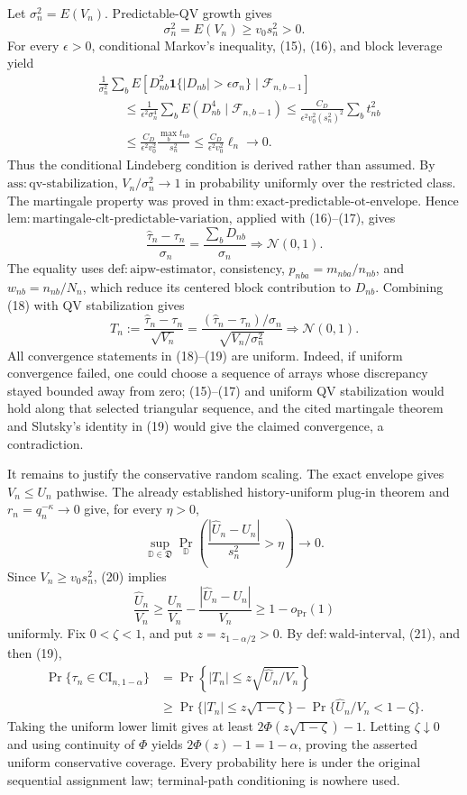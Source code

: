 Let \(\sigma_n^2=E(V_n)\). Predictable-QV growth gives
\[
\sigma_n^2=E(V_n)\ge v_0s_n^2>0.
\tag{16}
\]
For every \(\epsilon>0\), conditional Markov's inequality, (15), (16), and block leverage yield
\[
\begin{aligned}
&\frac1{\sigma_n^2}\sum_b
E\left[D_{nb}^2\mathbf1\{|D_{nb}|>\epsilon\sigma_n\}
\mid\mathcal F_{n,b-1}\right]\\
&\qquad\le\frac1{\epsilon^2\sigma_n^4}\sum_bE(D_{nb}^4\mid\mathcal F_{n,b-1})
\le\frac{C_D}{\epsilon^2v_0^2(s_n^2)^2}\sum_bt_{nb}^2\\
&\qquad\le\frac{C_D}{\epsilon^2v_0^2}
\frac{\max_bt_{nb}}{s_n^2}
\le\frac{C_D}{\epsilon^2v_0^2}\ell_n\longrightarrow0.
\end{aligned}
\tag{17}
\]
Thus the conditional Lindeberg condition is derived rather than assumed. By \(\mathrm{ass:qv\text{-}stabilization}\), \(V_n/\sigma_n^2\to1\) in probability uniformly over the restricted class. The martingale property was proved in \(\mathrm{thm:exact\text{-}predictable\text{-}ot\text{-}envelope}\). Hence \(\mathrm{lem:martingale\text{-}clt\text{-}predictable\text{-}variation}\), applied with (16)--(17), gives
\[
\frac{\widehat\tau_n-\tau_n}{\sigma_n}
=\frac{\sum_bD_{nb}}{\sigma_n}\Rightarrow\mathcal N(0,1).
\tag{18}
\]
The equality uses \(\mathrm{def:aipw\text{-}estimator}\), consistency, \(p_{nba}=m_{nba}/n_{nb}\), and \(w_{nb}=n_{nb}/N_n\), which reduce its centered block contribution to \(D_{nb}\). Combining (18) with QV stabilization gives
\[
T_n:=\frac{\widehat\tau_n-\tau_n}{\sqrt{V_n}}
=\frac{(\widehat\tau_n-\tau_n)/\sigma_n}{\sqrt{V_n/\sigma_n^2}}
\Rightarrow\mathcal N(0,1).
\tag{19}
\]
All convergence statements in (18)--(19) are uniform. Indeed, if uniform convergence failed, one could choose a sequence of arrays whose discrepancy stayed bounded away from zero; (15)--(17) and uniform QV stabilization would hold along that selected triangular sequence, and the cited martingale theorem and Slutsky's identity in (19) would give the claimed convergence, a contradiction.

It remains to justify the conservative random scaling. The exact envelope gives \(V_n\le U_n\) pathwise. The already established history-uniform plug-in theorem and \(r_n=q_n^{-\kappa}\to0\) give, for every \(\eta>0\),
\[
\sup_{\mathbb D\in\mathfrak D}
\Pr_{\mathbb D}\left(\frac{|\widehat U_n-U_n|}{s_n^2}>\eta\right)\longrightarrow0.
\tag{20}
\]
Since \(V_n\ge v_0s_n^2\), (20) implies
\[
\frac{\widehat U_n}{V_n}
\ge\frac{U_n}{V_n}-\frac{|\widehat U_n-U_n|}{V_n}
\ge1-o_{\Pr}(1)
\tag{21}
\]
uniformly. Fix \(0<\zeta<1\), and put \(z=z_{1-\alpha/2}>0\). By \(\mathrm{def:wald\text{-}interval}\), (21), and then (19),
\[
\begin{aligned}
\Pr\{\tau_n\in\mathrm{CI}_{n,1-\alpha}\}
&=\Pr\left\{|T_n|\le z\sqrt{\widehat U_n/V_n}\right\}\\
&\ge\Pr\{|T_n|\le z\sqrt{1-\zeta}\}
-\Pr\{\widehat U_n/V_n<1-\zeta\}.
\end{aligned}
\tag{22}
\]
Taking the uniform lower limit gives at least
\(2\Phi(z\sqrt{1-\zeta})-1\). Letting \(\zeta\downarrow0\) and using continuity of \(\Phi\) yields \(2\Phi(z)-1=1-\alpha\), proving the asserted uniform conservative coverage. Every probability here is under the original sequential assignment law; terminal-path conditioning is nowhere used.